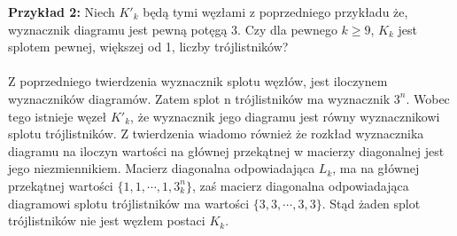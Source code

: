  \textbf{Przykład 2:}
 Niech $K'_{k}$ będą tymi węzłami z poprzedniego przykładu że, wyznacznik diagramu jest pewną potęgą 3. Czy dla pewnego $k\geq9$, $K_{k}$  jest splotem pewnej, większej od 1, liczby trójlistników? \\ \\
 Z poprzedniego twierdzenia wyznacznik splotu węzłów, jest iloczynem wyznaczników diagramów. Zatem splot n trójlistników ma wyznacznik $3^n$. Wobec tego istnieje węzeł $K'_{k}$, że wyznacznik jego diagramu jest równy wyznacznikowi splotu trójlistników. Z twierdzenia wiadomo również że rozkład wyznacznika diagramu na iloczyn wartości na głównej przekątnej w macierzy diagonalnej jest jego niezmiennikiem. Macierz diagonalna odpowiadająca $L_{k}$, ma na głównej przekątnej wartości $\lbrace 1, 1, \cdots, 1, 3^n_{k} \rbrace$, zaś macierz diagonalna odpowiadająca diagramowi splotu trójlistników ma wartości $\lbrace 3, 3, \cdots, 3, 3 \rbrace$. Stąd żaden splot trójlistników nie jest węzłem postaci $K_{k}$.
 

 
